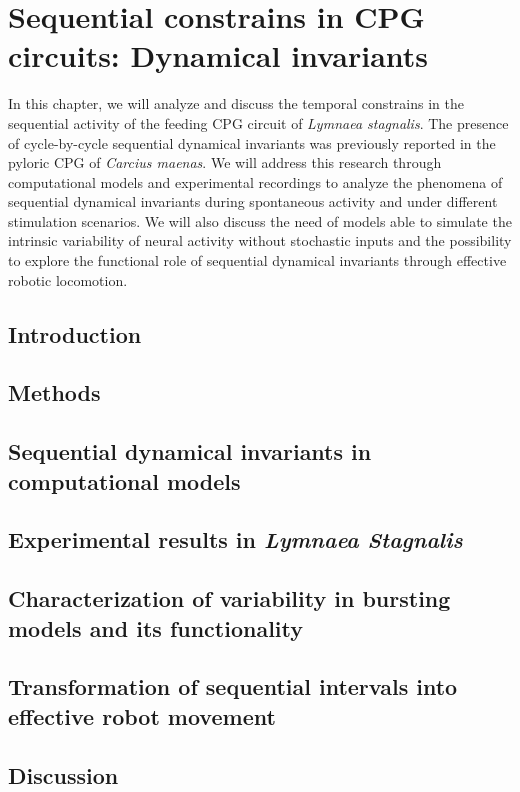 \chapter{Sequential constrains in CPG circuits: Dynamical invariants}
\label{c-invariants}
In this chapter, we will analyze and discuss the temporal constrains in the sequential activity of the feeding CPG circuit of \textit{Lymnaea stagnalis}. The presence of cycle-by-cycle sequential dynamical invariants was previously reported in the pyloric CPG of \textit{Carcius maenas}. We will address this research through computational models and experimental recordings to analyze the phenomena of sequential dynamical invariants during spontaneous activity and under different stimulation scenarios. We will also discuss the need of models able to simulate the intrinsic variability of neural activity without stochastic inputs and the possibility to explore the functional role of sequential dynamical invariants through effective robotic locomotion.

\section{Introduction}

\section{Methods}

\section{Sequential dynamical invariants in computational models}
\label{c-invariants-model}

\section{Experimental results in \textit{Lymnaea Stagnalis}}
\label{sec:experimental sussex}

\section{Characterization of variability in bursting models and its functionality}
\label{sec:model variability}

\section{Transformation of sequential intervals into effective robot movement}
\label{sec:robot}

\section{Discussion}

